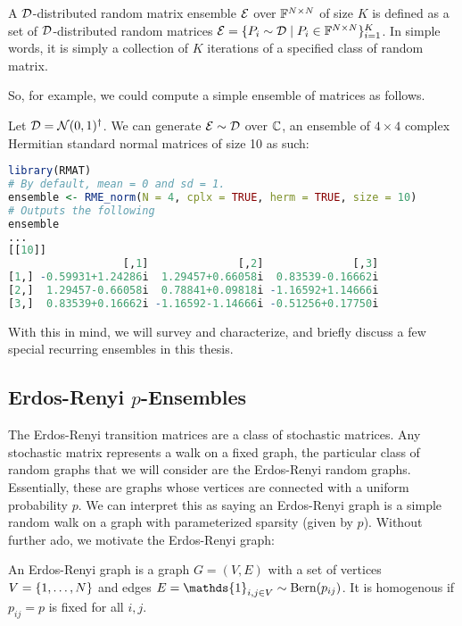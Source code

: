 \begin{definition}
A $\D$-distributed random matrix ensemble $\Ens$ over $\F^{N \times N}$ of size $K$ is defined as a set of $\D$-distributed random matrices $\Ens = \{P_i \sim \mathcal{D} \mid P_i \in \F^{N \times N}\}_{i = 1}^K$. In simple words, it is simply a collection of $K$ iterations of a specified class of random matrix.
\end{definition}

\medskip
\noindent So, for example, we could compute a simple ensemble of matrices as follows.
\begin{code}
Let $\mathcal{D} = \Normal(0,1)^{\dagger}$. We can generate $\Ens \sim \D$ over $\Cc$, an ensemble of $4 \times 4$ complex Hermitian standard normal matrices of size 10 as such:
\end{code}

\begin{lstlisting}[language=R]
library(RMAT)
# By default, mean = 0 and sd = 1.
ensemble <- RME_norm(N = 4, cplx = TRUE, herm = TRUE, size = 10)
# Outputs the following
ensemble
...
[[10]]
                  [,1]              [,2]              [,3]
[1,] -0.59931+1.24286i  1.29457+0.66058i  0.83539-0.16662i
[2,]  1.29457-0.66058i  0.78841+0.09818i -1.16592+1.14666i
[3,]  0.83539+0.16662i -1.16592-1.14666i -0.51256+0.17750i
\end{lstlisting}

With this in mind, we will survey and characterize, and briefly discuss a few special recurring ensembles in this thesis.


\subsection{Erdos-Renyi $p$-Ensembles}

The Erdos-Renyi transition matrices are a class of stochastic matrices. Any stochastic matrix represents a walk on a fixed graph, the particular class of random graphs that we will consider are the Erdos-Renyi random graphs. Essentially, these are graphs whose vertices are connected with a uniform probability $p$. We can interpret this as saying an Erdos-Renyi graph is a simple random walk on a graph with parameterized sparsity (given by $p$). Without further ado, we motivate the Erdos-Renyi graph:

\begin{definition}
An Erdos-Renyi graph is a graph $G = (V,E)$ with a set of vertices $V = \{\oneto[N]\}$ and edges $E = \mathds{1}_{i,j \in V} \sim \Bern(p_{ij})$. It is homogenous if $p_{ij} = p$ is fixed for all $i, j$.
\end{definition}

